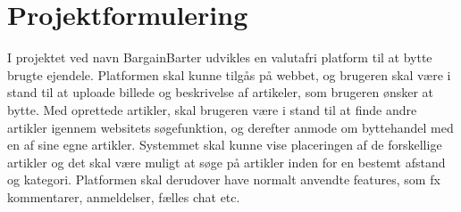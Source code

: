\chapter{Projektformulering}

I projektet ved navn BargainBarter udvikles en valutafri platform til at bytte brugte ejendele. Platformen skal kunne tilgås på webbet, og brugeren skal være i stand til at uploade billede og beskrivelse af artikeler, som brugeren ønsker at bytte. Med oprettede artikler, skal brugeren være i stand til at finde andre artikler igennem websitets søgefunktion, og derefter anmode om byttehandel med en af sine egne artikler. Systemmet skal kunne vise placeringen af de forskellige artikler og det skal være muligt at søge på artikler inden for en bestemt afstand og kategori. Platformen skal derudover have normalt anvendte features, som fx kommentarer, anmeldelser, fælles chat etc.     
